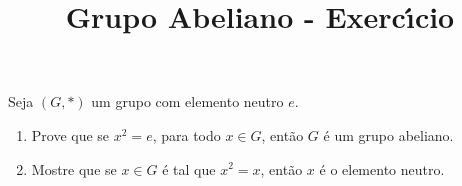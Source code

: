 \documentclass{beamer}
\title{Grupo Abeliano - Exerc{\'\i}cio}
\author[\autor]{\autor}
\institute[\instituto]{\instituto}
\date{}
\begin{document}


    \begin{frame}
        \begin{exercicio}
            Seja $(G,*)$ um grupo com elemento neutro $e$.

            \vspace{.4cm}

            \begin{enumerate}[label=({\alph*})]
                \item Prove que se $x^2 = e$, para todo $x\in G$, ent{\~a}o $G$ {\'e} um grupo abeliano.

                \vspace{.4cm}

                \item Mostre que se $x\in G$ {\'e} tal que $x^2 = x$, ent{\~a}o $x$ {\'e} o elemento neutro.

                \vspace{.4cm}

            \end{enumerate}
        \end{exercicio}
    \end{frame}
\end{document}

